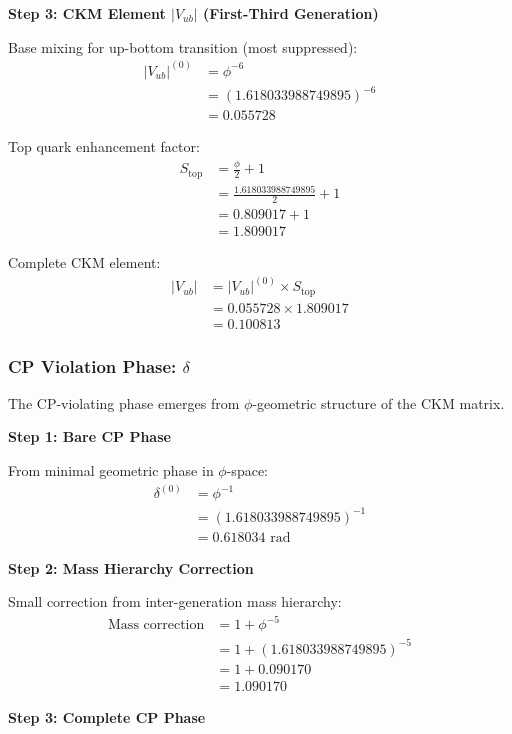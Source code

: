 \textbf{Step 3: CKM Element $|V_{ub}|$ (First-Third Generation)}

Base mixing for up-bottom transition (most suppressed):
\begin{align}
|V_{ub}|^{(0)} &= \phi^{-6} \tag{Three generation separation} \\
&= (1.618033988749895)^{-6} \\
&= 0.055728
\end{align}

Top quark enhancement factor:
\begin{align}
S_{\text{top}} &= \frac{\phi}{2} + 1 \\
&= \frac{1.618033988749895}{2} + 1 \\
&= 0.809017 + 1 \\
&= 1.809017
\end{align}

Complete CKM element:
\begin{align}
|V_{ub}| &= |V_{ub}|^{(0)} \times S_{\text{top}} \\
&= 0.055728 \times 1.809017 \\
&= 0.100813
\end{align}

\subsubsection{CP Violation Phase: $\delta$}

The CP-violating phase emerges from $\phi$-geometric structure of the CKM matrix.

\textbf{Step 1: Bare CP Phase}

From minimal geometric phase in $\phi$-space:
\begin{align}
\delta^{(0)} &= \phi^{-1} \tag{Golden ratio phase} \\
&= (1.618033988749895)^{-1} \\
&= 0.618034 \text{ rad}
\end{align}

\textbf{Step 2: Mass Hierarchy Correction}

Small correction from inter-generation mass hierarchy:
\begin{align}
\text{Mass correction} &= 1 + \phi^{-5} \\
&= 1 + (1.618033988749895)^{-5} \\
&= 1 + 0.090170 \\
&= 1.090170
\end{align}

\textbf{Step 3: Complete CP Phase}

